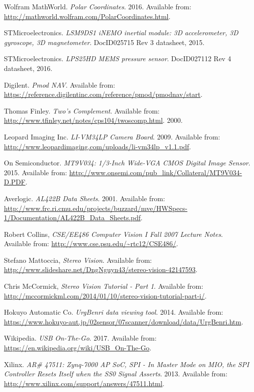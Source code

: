 \begin{thebibliography}{100}
 Wolfram MathWorld. \textit{Polar Coordinates}. 2016. Available from: \url{http://mathworld.wolfram.com/PolarCoordinates.html}.

 STMicroelectronics. \textit{LSM9DS1 iNEMO inertial module: 3D accelerometer, 3D gyroscope, 3D magnetometer}. DocID025715 Rev 3 datasheet, 2015.

 STMicroelectronics. \textit{LPS25HD MEMS pressure sensor}. DocID027112 Rev 4 datasheet, 2016.

 Digilent. \textit{Pmod NAV}. Available from: \url{https://reference.digilentinc.com/reference/pmod/pmodnav/start}.

 Thomas Finley. \textit{Two's Complement}. Available from: \url{http://www.tfinley.net/notes/cps104/twoscomp.html}. 2000.

 Leopard Imaging Inc.
\textit{LI-VM34LP Camera Board}. 2009.
Available from: \url{http://www.leopardimaging.com/uploads/li-vm34lp_v1.1.pdf}.

 On Semiconductor. 
\textit{MT9V034: 1/3-Inch Wide-VGA CMOS Digital Image Sensor}. 2015. 
Available from: \url{http://www.onsemi.com/pub_link/Collateral/MT9V034-D.PDF}.

 Averlogic.
\textit{AL422B Data Sheets}. 2001.
Available from: \url{http://www.frc.ri.cmu.edu/projects/buzzard/mve/HWSpecs-1/Documentation/AL422B_Data_Sheets.pdf}.

 Robert Collins, \textit{CSE/EE486 Computer Vision I Fall 2007 Lecture Notes}. Available from: \url{http://www.cse.psu.edu/~rtc12/CSE486/}.

 Stefano Mattoccia, \textit{Stereo Vision}. Available from: \url{http://www.slideshare.net/DngNguyn43/stereo-vision-42147593}.

 Chris McCormick, \textit{Stereo Vision Tutorial  - Part 1}. Available from: \url{http://mccormickml.com/2014/01/10/stereo-vision-tutorial-part-i/}.

 Hokuyo Automatic Co. \textit{UrgBenri data viewing tool}. 2014. Available from: \url{https://www.hokuyo-aut.jp/02sensor/07scanner/download/data/UrgBenri.htm}.

 Wikipedia. \textit{USB On-The-Go}. 2017. Available from: \url{https://en.wikipedia.org/wiki/USB_On-The-Go}.

 Xilinx. \textit{AR\# 47511: Zynq-7000 AP SoC, SPI - In Master Mode on MIO, the SPI Controller Resets Itself when the SS0 Signal Asserts}. 2013. Available from: \url{http://www.xilinx.com/support/answers/47511.html}.


\end{thebibliography}
